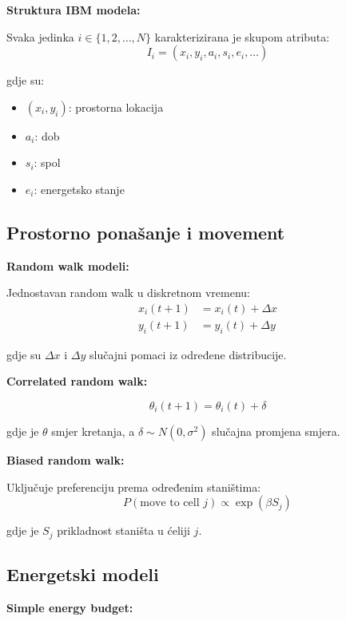 \documentclass[11pt,oneside]{book}
\begin{document}
\textbf{Struktura IBM modela:}

Svaka jedinka $i \in \{1, 2, \ldots, N\}$ karakterizirana je skupom atributa:
\begin{equation}
	I_i = (x_i, y_i, a_i, s_i, e_i, \ldots)
\end{equation}

gdje su:
\begin{itemize}
	\item $(x_i, y_i)$: prostorna lokacija
	\item $a_i$: dob
	\item $s_i$: spol
	\item $e_i$: energetsko stanje
\end{itemize}

\subsection{Prostorno ponašanje i movement}

\textbf{Random walk modeli:}

Jednostavan random walk u diskretnom vremenu:
\begin{align}
	x_i(t+1) &= x_i(t) + \Delta x \\
	y_i(t+1) &= y_i(t) + \Delta y
\end{align}

gdje su $\Delta x$ i $\Delta y$ slučajni pomaci iz određene distribucije.

\textbf{Correlated random walk:}

\begin{equation}
	\theta_i(t+1) = \theta_i(t) + \delta
\end{equation}

gdje je $\theta$ smjer kretanja, a $\delta \sim N(0, \sigma^2)$ slučajna promjena smjera.

\textbf{Biased random walk:}

Uključuje preferenciju prema određenim staništima:
\begin{equation}
	P(\text{move to cell } j) \propto \exp(\beta S_j)
\end{equation}

gdje je $S_j$ prikladnost staništa u ćeliji $j$.

\subsection{Energetski modeli}

\textbf{Simple energy budget:}
\end{document}

